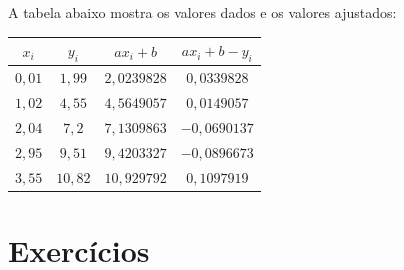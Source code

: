 \documentclass[main.tex]{subfiles}
\begin{document}
\begin{sol}
A tabela abaixo mostra os valores dados e os valores ajustados:
\begin{center}
\begin{tabular}{|c|c|c|c|}
\hline
$x_i$ & $y_i$& $ax_i+b$& $ax_i+b-y_i$\\
\hline
$0,01$ & $1,99$ & $2,0239828$ & $0,0339828$\\
$1,02$ & $4,55$ & $4,5649057$ & $0,0149057$ \\
$2,04$ & $7,2$ & $7,1309863$ & $-0,0690137$ \\
$2,95$ & $9,51$ & $9,4203327$ & $-0,0896673$  \\
$3,55$ & $10,82$ & $10,929792$ & $0,1097919$ \\
\hline
\end{tabular}  
\end{center}
\end{sol}

\section*{Exercícios}
\end{document}
